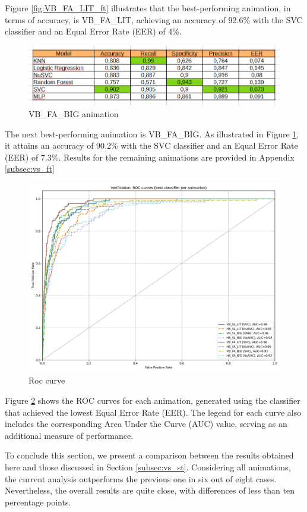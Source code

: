\documentclass{article}
\begin{document}
Figure \ref{fig:VB_FA_LIT_ft} illustrates that the best-performing animation, in terms of accuracy, is VB\_FA\_LIT, achieving an accuracy of 92.6\% with the SVC classifier and an Equal Error Rate (EER) of 4\%.

\begin{figure}[ht]
    \centering
    \includegraphics[width = 0.8
    \textwidth]{Images/Results/Verification_single/ft/VB_FA_BIG.png}
    \caption{VB\_FA\_BIG animation}
    \label{fig:VB_FA_BIG_ft}
\end{figure}

The next best-performing animation is VB\_FA\_BIG. 
As illustrated in Figure \ref{fig:VB_FA_BIG_ft}, it attains an accuracy of 90.2\% with the SVC classifier and an Equal Error Rate (EER) of 7.3\%. 
Results for the remaining animations are provided in Appendix \ref{subsec:vs_ft}

\begin{figure}[ht]
    \centering
    \includegraphics[width = 0.6
    \textwidth]{Images/Results/Verification_single/ft/best_animation_roc_curves_ft.png}
    \caption{Roc curve}
    \label{fig:roc_ft}
\end{figure}

Figure \ref{fig:roc_ft} shows the ROC curves for each animation, generated using the classifier that achieved the lowest Equal Error Rate (EER). 
The legend for each curve also includes the corresponding Area Under the Curve (AUC) value, serving as an additional measure of performance.

To conclude this section, we present a comparison between the results obtained here and those discussed in Section \ref{subsec:vs_st}. 
Considering all animations, the current analysis outperforms the previous one in six out of eight cases. 
Nevertheless, the overall results are quite close, with differences of less than ten percentage points.
\end{document}
